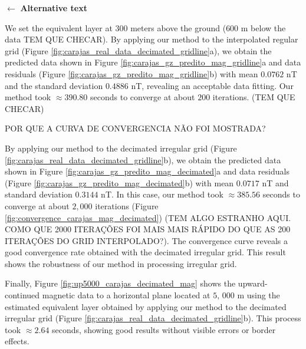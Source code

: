 $\leftarrow$ \textbf{Alternative text}

We set the equivalent layer at $300$ meters above the ground ($600$ m below the data TEM QUE CHECAR).
By applying our method to the interpolated regular grid 
(Figure \ref{fig:carajas_real_data_decimated_gridline}a), we obtain the  predicted data shown in 
Figure \ref{fig:carajas_gz_predito_mag_gridline}a and data residuals 
(Figure \ref{fig:carajas_gz_predito_mag_gridline}b) with mean $0.0762$ nT and the standard deviation 
$0.4886$ nT, revealing an acceptable data fitting.
Our method took $\approx 390.80$ seconds to converge at about $200$ iterations. (TEM QUE CHECAR)

POR QUE A CURVA DE CONVERGENCIA NÃO FOI MOSTRADA?

By applying our method to the decimated irregular grid 
(Figure \ref{fig:carajas_real_data_decimated_gridline}b), we obtain the predicted data shown in 
Figure \ref{fig:carajas_gz_predito_mag_decimated}a and data residuals 
(Figure \ref{fig:carajas_gz_predito_mag_decimated}b) with mean $0.0717$ nT and standard deviation 
$0.3144$ nT. In this case, our method took $\approx 385.56$ seconds 
to converge at about $2,000$ iterations (Figure \ref{fig:convergence_carajas_mag_decimated}) (TEM ALGO
ESTRANHO AQUI. COMO QUE 2000 ITERAÇÕES FOI MAIS MAIS RÁPIDO DO QUE AS 200 ITERAÇÕES DO GRID
INTERPOLADO?). The convergence curve reveals a good convergence rate obtained with the decimated 
irregular grid. This result shows the robustness of our method in processing irregular grid.


Finally, Figure \ref{fig:up5000_carajas_decimated_mag} shows the upward-continued magnetic data to a
horizontal plane located at $5, \,000$ m using the estimated equivalent layer obtained by applying our
method to the decimated irregular grid (Figure \ref{fig:carajas_real_data_decimated_gridline}b).
This process took $\approx 2.64$ seconds, showing good results without visible errors or border 
effects.